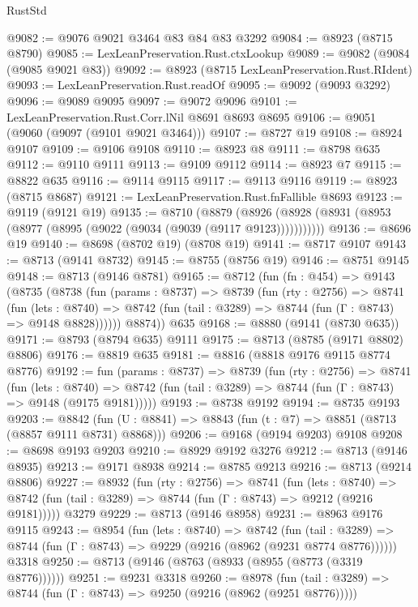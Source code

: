 \begin{lexlean}{RustStd}
\begin{coremodule}
@9082 := @9076 @9021 @3464 @83 @84 @83 @3292
@9084 := @8923 (@8715 @8790)
@9085 := LexLeanPreservation.Rust.ctxLookup
@9089 := @9082 (@9084 (@9085 @9021 @83))
@9092 := @8923 (@8715 LexLeanPreservation.Rust.RIdent)
@9093 := LexLeanPreservation.Rust.readOf
@9095 := @9092 (@9093 @3292)
@9096 := @9089 @9095
@9097 := @9072 @9096
@9101 := LexLeanPreservation.Rust.Corr.lNil @8691 @8693 @8695
@9106 := @9051 (@9060 (@9097 (@9101 @9021 @3464)))
@9107 := @8727 @19
@9108 := @8924 @9107
@9109 := @9106 @9108
@9110 := @8923 @8
@9111 := @8798 @635
@9112 := @9110 @9111
@9113 := @9109 @9112
@9114 := @8923 @7
@9115 := @8822 @635
@9116 := @9114 @9115
@9117 := @9113 @9116
@9119 := @8923 (@8715 @8687)
@9121 := LexLeanPreservation.Rust.fnFallible @8693
@9123 := @9119 (@9121 @19)
@9135 := @8710
    (@8879 (@8926 (@8928 (@8931 (@8953 (@8977 (@8995 (@9022 (@9034 (@9039 (@9117 @9123)))))))))))
@9136 := @8696 @19
@9140 := @8698 (@8702 @19) (@8708 @19)
@9141 := @8717 @9107
@9143 := @8713 (@9141 @8732)
@9145 := @8755 (@8756 @19)
@9146 := @8751 @9145
@9148 := @8713 (@9146 @8781)
@9165 := @8712
    (fun (fn : @454) =>
    @9143
      (@8735
        (@8738
          (fun (params : @8737) =>
          @8739
            (fun (rty : @2756) =>
            @8741
              (fun (lets : @8740) =>
              @8742 (fun (tail : @3289) => @8744 (fun (Γ : @8743) => @9148 @8828))))))
        @8874))
    @635
@9168 := @8880 (@9141 (@8730 @635))
@9171 := @8793 (@8794 @635) @9111
@9175 := @8713 (@8785 (@9171 @8802) @8806)
@9176 := @8819 @635
@9181 := @8816 (@8818 @9176 @9115 @8774 @8776)
@9192 := fun (params : @8737) =>
  @8739
    (fun (rty : @2756) =>
    @8741
      (fun (lets : @8740) =>
      @8742 (fun (tail : @3289) => @8744 (fun (Γ : @8743) => @9148 (@9175 @9181)))))
@9193 := @8738 @9192
@9194 := @8735 @9193
@9203 := @8842 (fun (U : @8841) => @8843 (fun (t : @7) => @8851 (@8713 (@8857 @9111 @8731) @8868)))
@9206 := @9168 (@9194 @9203) @9108
@9208 := @8698 @9193 @9203
@9210 := @8929 @9192 @3276
@9212 := @8713 (@9146 @8935)
@9213 := @9171 @8938
@9214 := @8785 @9213
@9216 := @8713 (@9214 @8806)
@9227 := @8932
    (fun (rty : @2756) =>
    @8741
      (fun (lets : @8740) =>
      @8742 (fun (tail : @3289) => @8744 (fun (Γ : @8743) => @9212 (@9216 @9181)))))
    @3279
@9229 := @8713 (@9146 @8958)
@9231 := @8963 @9176 @9115
@9243 := @8954
    (fun (lets : @8740) =>
    @8742
      (fun (tail : @3289) => @8744 (fun (Γ : @8743) => @9229 (@9216 (@8962 (@9231 @8774 @8776))))))
    @3318
@9250 := @8713 (@9146 (@8763 (@8933 (@8955 (@8773 (@3319 @8776))))))
@9251 := @9231 @3318
@9260 := @8978
    (fun (tail : @3289) => @8744 (fun (Γ : @8743) => @9250 (@9216 (@8962 (@9251 @8776)))))

\end{coremodule}
\end{lexlean}
